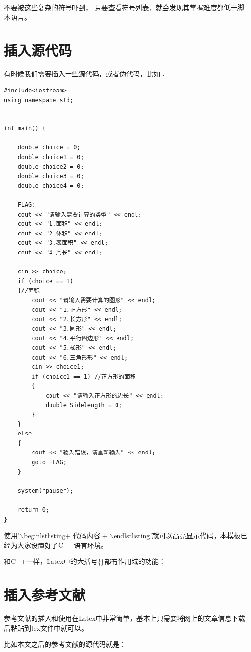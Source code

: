 \documentclass[a4paper, 10pt]{AvicReport}
\begin{document}
不要被这些复杂的符号吓到， 只要查看符号列表，就会发现其掌握难度都低于脚本语言。



\section{插入源代码}
有时候我们需要插入一些源代码，或者伪代码，比如：
\begin{lstlisting}
#include<iostream>
using namespace std;
 
 
int main() {
 
    double choice = 0;
    double choice1 = 0;
    double choice2 = 0;
    double choice3 = 0;
    double choice4 = 0;
     
    FLAG:
    cout << "请输入需要计算的类型" << endl;
    cout << "1.面积" << endl;
    cout << "2.体积" << endl;
    cout << "3.表面积" << endl;
    cout << "4.周长" << endl;
 
    cin >> choice;
    if (choice == 1)
    {//面积
        cout << "请输入需要计算的图形" << endl;
        cout << "1.正方形" << endl;
        cout << "2.长方形" << endl;
        cout << "3.圆形" << endl;
        cout << "4.平行四边形" << endl;
        cout << "5.梯形" << endl;
        cout << "6.三角形形" << endl;
        cin >> choice1;
        if (choice1 == 1) //正方形的面积
        {
            cout << "请输入正方形的边长" << endl;
            double Sidelength = 0;
        }
    }
    else
    {
        cout << "输入错误，请重新输入" << endl;
        goto FLAG;
    }
 
    system("pause");
 
    return 0;
}
\end{lstlisting}


使用"$\backslash$begin{lstlisting}+ 代码内容 + $\backslash$end{lstlisting}"就可以高亮显示代码，本模板已经为大家设置好了C++语言环境。


和C++一样，Latex中的大括号\{\}都有作用域的功能：

{\erhao\kai{\color{red}{You Are Welcome！}}}






\section{插入参考文献}
参考文献的插入和使用在Latex中非常简单，基本上只需要将网上的文章信息下载后粘贴到tex文件中就可以。

比如本文之后的参考文献的源代码就是：
\end{document}
